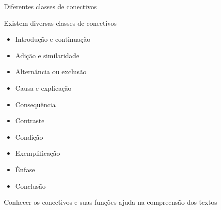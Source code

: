 \documentclass[compress,mathserif,xcolor=table]{beamer}
\begin{document}
\begin{frame}{Diferentes classes de conectivos}

Existem diversas classes de conectivos

\vspace{0.25cm}

\begin{minipage}{.49\textwidth}
\begin{itemize}
    \item Introdução e continuação
    \item Adição e similaridade
    \item Alternância ou exclusão
    \item Causa e explicação
    \item Consequência
\end{itemize}
\end{minipage}
\begin{minipage}{.49\textwidth}
\begin{itemize}
    \item Contraste
    \item Condição
    \item Exemplificação
    \item Ênfase
    \item Conclusão
\end{itemize}
\end{minipage}

\vspace{1cm}

Conhecer os conectivos e suas funções ajuda na compreensão dos textos
\end{frame}

\end{document}
